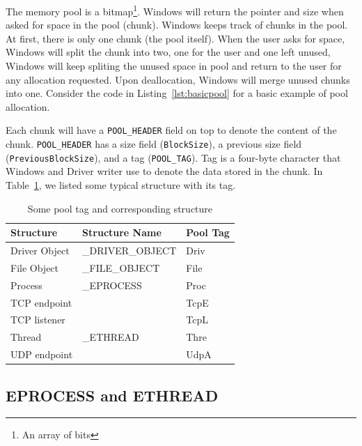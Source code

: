 The memory pool is a bitmap\footnote{An array of bits}. Windows will return the pointer and size when asked for space in the pool (chunk). Windows keeps track of chunks in the pool. At first, there is only one chunk (the pool itself). When the user asks for space, Windows will split the chunk into two, one for the user and one left unused, Windows will keep spliting the unused space in pool and return to the user for any allocation requested. Upon deallocation, Windows will merge unused chunks into one. Consider the code in Listing~\ref{lst:basicpool} for a basic example of pool allocation.


Each chunk will have a \texttt{POOL\_HEADER} field on top to denote the content of the chunk. \texttt{POOL\_HEADER} has a size field (\texttt{BlockSize}), a previous size field (\texttt{PreviousBlockSize}), and a tag (\texttt{POOL\_TAG}). Tag is a four-byte character that Windows and Driver writer use to denote the data stored in the chunk. In Table~\ref{tab:pooltag}, we listed some typical structure with its tag.


\begin{center}
\begin{table}[h]
\begin{tabular}{lll}
Structure     & Structure Name   & Pool Tag \\ \hline
Driver Object & \_DRIVER\_OBJECT & Driv     \\
File Object   & \_FILE\_OBJECT   & File     \\
Process       & \_EPROCESS       & Proc     \\
TCP endpoint  &                  & TcpE     \\
TCP listener  &                  & TcpL     \\
Thread        & \_ETHREAD        & Thre     \\
UDP endpoint  &                  & UdpA     \\
\end{tabular}
\caption{Some pool tag and corresponding structure}
\label{tab:pooltag}
\end{table}
\end{center}

\subsection[EPROCESS and ETHREAD]{EPROCESS and ETHREAD}

